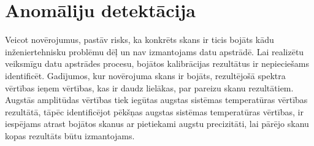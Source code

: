 







\section{Anomāliju detektācija} \label{anomalies}
Veicot novērojumus, pastāv risks, ka konkrēts skans ir ticis bojāts kādu inženiertehnisku problēmu dēļ un nav izmantojams datu apstrādē. Lai realizētu veiksmīgu datu apstrādes procesu, bojātos kalibrācijas rezultātus ir nepieciešams identificēt.  
Gadījumos, kur novērojuma skans ir bojāts, rezultējošā spektra vērtības ieņem vērtības, kas ir daudz lielākas, par pareizu skanu rezultātiem. Augstās amplitūdas vērtības tiek iegūtas augstas sistēmas temperatūras vērtības rezultātā, tāpēc identificējot pēkšņas augstas sistēmas temperatūras vērtības, ir iespējams atrast bojātos skanus ar pietiekami augstu precizitāti, lai pārējo skanu kopas rezultāts būtu izmantojams.

